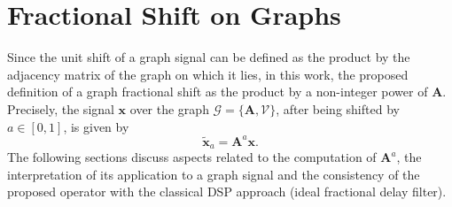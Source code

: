 \section{Fractional Shift on Graphs}\label{sec:fracshift}
Since the unit shift of a graph signal can be defined as the product by the adjacency matrix of the graph on which it lies, in this work, the proposed definition of a graph fractional shift as the product by a non-integer power of $ \mathbf{A} $. Precisely, the signal $\mathbf{x}$ over the graph $\mathcal{G} = \{ \mathbf{A}, {\mathcal{V}} \}$, after being shifted by $a\in[0,1]$, is given by
\begin{equation}
    \label{eq:def_frac_delay}
    \widetilde{\mathbf{x}}_a = \mathbf{A}^a \mathbf{x}.
\end{equation}
The following sections discuss aspects related to the computation of $\mathbf{A}^a$, the interpretation of its application to a graph signal and the consistency of the proposed operator with the classical DSP approach (ideal fractional delay filter).


